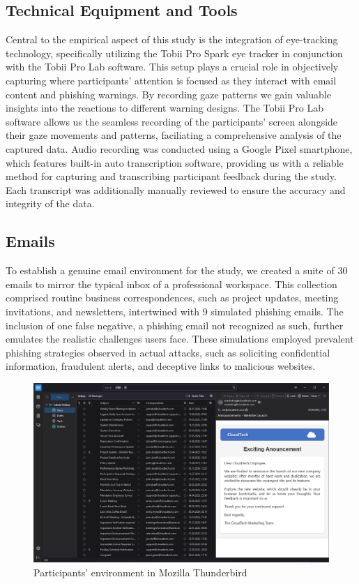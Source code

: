 \documentclass[
  a4paper,  %
  twoside,  %
  bibliography=totoc,
  headsepline,
  cleardoublepage=empty,
  parskip=half,
  draft=false
]{scrbook}
\begin{document}
\subsection{Technical Equipment and Tools}
Central to the empirical aspect of this study is the integration of eye-tracking technology, specifically utilizing the Tobii Pro Spark eye tracker in conjunction with the Tobii Pro Lab software. This setup plays a crucial role in objectively capturing where participants' attention is focused as they interact with email content and phishing warnings. By recording gaze patterns we gain valuable insights into the reactions to different warning designs. The Tobii Pro Lab software allows us the seamless recording of the participants' screen alongside their gaze movements and patterns, faciliating a comprehensive analysis of the captured data. \newline 
Audio recording was conducted using a Google Pixel smartphone, which features built-in auto transcription software, providing us with a reliable method for capturing and transcribing participant feedback during the study. Each transcript was additionally manually reviewed to ensure the accuracy and integrity of the data.

\subsection{Emails}
To establish a genuine email environment for the study, we created a suite of 30 emails to mirror the typical inbox of a professional workspace. This collection comprised routine business correspondences, such as project updates, meeting invitations, and newsletters, intertwined with 9 simulated phishing emails. The inclusion of one false negative, a phishing email not recognized as such, further emulates the realistic challenges users face. These simulations employed prevalent phishing strategies observed in actual attacks, such as soliciting confidential information, fraudulent alerts, and deceptive links to malicious websites.

\begin{figure} [ht]
    \centering
    \includegraphics[width=1\linewidth]{figures/example2.png}
    \caption{Participants' environment in Mozilla Thunderbird}
    \label{fig:example2}
\end{figure}
\end{document}
